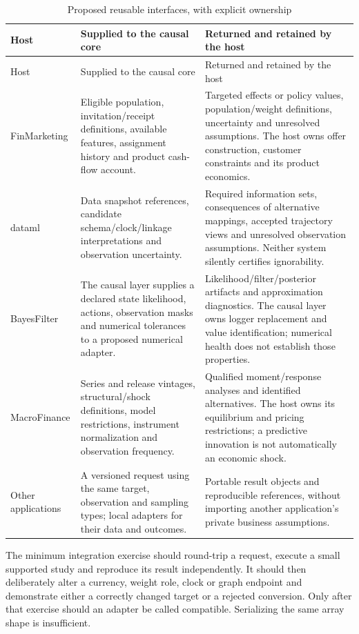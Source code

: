\begin{longtable}{P{.16\textwidth}P{.37\textwidth}P{.40\textwidth}}
\caption{Proposed reusable interfaces, with explicit ownership}
\label{r3:integration}\\
\toprule Host & Supplied to the causal core & Returned and retained by the host\\
\midrule\endfirsthead
\toprule Host & Supplied to the causal core & Returned and retained by the host\\
\midrule\endhead
FinMarketing &
Eligible population, invitation/receipt definitions, available features,
assignment history and product cash-flow account. &
Targeted effects or policy values, population/weight definitions,
uncertainty and unresolved assumptions. The host owns offer construction,
customer constraints and its product economics.\\
dataml &
Data snapshot references, candidate schema/clock/linkage interpretations
and observation uncertainty. &
Required information sets, consequences of alternative mappings,
accepted trajectory views and unresolved observation assumptions.
Neither system silently certifies ignorability.\\
BayesFilter &
The causal layer supplies a declared state likelihood, actions,
observation masks and numerical tolerances to a proposed numerical adapter. &
Likelihood/filter/posterior artifacts and approximation diagnostics.
The causal layer owns logger replacement and value identification;
numerical health does not establish those properties.\\
MacroFinance &
Series and release vintages, structural/shock definitions, model
restrictions, instrument normalization and observation frequency. &
Qualified moment/response analyses and identified alternatives.
The host owns its equilibrium and pricing restrictions; a predictive
innovation is not automatically an economic shock.\\
Other applications &
A versioned request using the same target, observation and sampling types;
local adapters for their data and outcomes. &
Portable result objects and reproducible references, without importing
another application's private business assumptions.\\
\bottomrule
\end{longtable}

The minimum integration exercise should round-trip a request, execute a
small supported study and reproduce its result independently. It should
then deliberately alter a currency, weight role, clock or graph endpoint
and demonstrate either a correctly changed target or a rejected conversion.
Only after that exercise should an adapter be called compatible.
Serializing the same array shape is insufficient.

